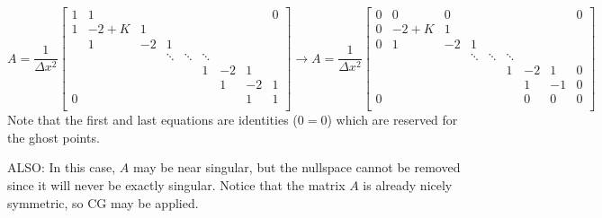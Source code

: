 \documentclass[landscape]{article}
\begin{document}
\[ A = \frac{1}{\Delta x^2} \left[\begin{array}{ccccccccc}
1  & 1     &           &           &           &           &           &         &  0 \\
1  & -2+K  & 1         &           &           &           &           &         &    \\
   & 1     & -2        & 1         &           &           &           &         &    \\
   &       &           & \ddots    & \ddots    & \ddots    &           &         &    \\
   &       &           &           &           & 1         & -2        & 1       &    \\
   &       &           &           &           &           &  1        & -2      &  1 \\
0  &       &           &           &           &           &           & 1       &  1 \\
\end{array} \right]
\rightarrow
A = \frac{1}{\Delta x^2} \left[\begin{array}{ccccccccc}
0  & 0     & 0         &           &           &           &           &         &  0 \\
0  & -2+K  & 1         &           &           &           &           &         &    \\
0  & 1     & -2        & 1         &           &           &           &         &    \\
   &       &           & \ddots    & \ddots    & \ddots    &           &         &    \\
   &       &           &           &           & 1         & -2        & 1       &  0 \\
   &       &           &           &           &           &  1        & -1      &  0 \\
0  &       &           &           &           &           &  0        & 0       &  0 \\
\end{array} \right]
\]
Note that the first and last equations are identities ($0=0$) which are reserved for the ghost points.

ALSO: In this case, $A$ may be near singular, but the nullspace cannot be removed since it will never be exactly singular. Notice that the matrix $A$ is already nicely symmetric, so CG may be applied.

\newpage
\end{document}
